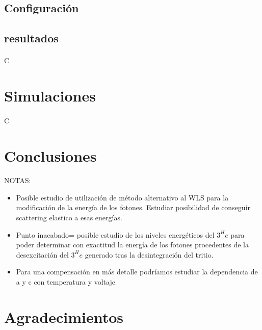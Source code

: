 \documentclass[11pt, a4paper]{article}
\begin{document}
	\subsection {Configuración} 
	\subsection {resultados}
\paragraph {}
C

\section {Simulaciones}
\paragraph {}
C

\section {Conclusiones}
\paragraph {}
NOTAS:
\begin{itemize}
\item{} Posible estudio de utilización de método alternativo al WLS para la modificación de la energía de los fotones. Estudiar posibilidad de conseguir scattering elastico a esas energías.
\item {} Punto inacabado= posible estudio de los niveles energéticos del $3^He$ para poder determinar con exactitud la energía de los fotones procedentes de la desexcitación del $3^He$ generado tras la desintegración del tritio.
\item {} Para una compensación en más detalle podríamos estudiar la dependencia de a y c con temperatura y voltaje
\end{itemize}

\section {Agradecimientos}
\end{document}
